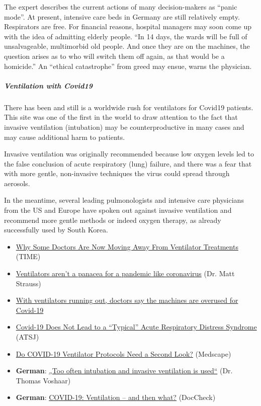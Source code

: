 The expert describes the current actions of many decision-makers as
``panic mode''. At present, intensive care beds in Germany are still
relatively empty. Respirators are free. For financial reasons, hospital
managers may soon come up with the idea of admitting elderly people.
``In 14 days, the wards will be full of unsalvageable, multimorbid old
people. And once they are on the machines, the question arises as to who
will switch them off again, as that would be a homicide.'' An ``ethical
catastrophe'' from greed may ensue, warns the physician.

\hypertarget{ventilation-with-covid19-1}{%
\subparagraph{\texorpdfstring{\textbf{Ventilation with
Covid19}}{Ventilation with Covid19}}\label{ventilation-with-covid19-1}}

There has been and still is a worldwide rush for ventilators for Covid19
patients. This site was one of the first in the world to draw attention
to the fact that invasive ventilation (intubation) may be
counterproductive in many cases and may cause additional harm to
patients.

Invasive ventilation was originally recommended because low oxygen
levels led to the false conclusion of acute respiratory (lung) failure,
and there was a fear that with more gentle, non-invasive techniques the
virus could spread through aerosols.

In the meantime, several leading pulmonologists and intensive care
physicians from the US and Europe have spoken out against invasive
ventilation and recommend more gentle methods or indeed oxygen therapy,
as already successfully used by South Korea.

\begin{itemize}
\tightlist
\item
  \href{https://time.com/5818547/ventilators-coronavirus/}{Why Some
  Doctors Are Now Moving Away From Ventilator Treatments} (TIME)
\item
  \href{https://www.spectator.co.uk/article/Ventilators-aren-t-a-panacea-for-a-pandemic-like-coronavirus}{Ventilators
  aren't a panacea for a pandemic like coronavirus} (Dr. Matt Strauss)
\item
  \href{https://www.statnews.com/2020/04/08/doctors-say-ventilators-overused-for-covid-19/}{With
  ventilators running out, doctors say the machines are overused for
  Covid-19}
\item
  \href{https://www.atsjournals.org/doi/pdf/10.1164/rccm.202003-0817LE}{Covid-19
  Does Not Lead to a ``Typical'' Acute Respiratory Distress Syndrome}
  (ATSJ)
\item
  \href{https://www.medscape.com/viewarticle/928156}{Do COVID-19
  Ventilator Protocols Need a Second Look?} (Medscape)
\item
  \textbf{German}:
  \href{https://www.vpneumo.de/fileadmin/pdf/f2004071.007_Voshaar.pdf}{„Too
  often intubation and invasive ventilation is used``} (Dr. Thomas
  Voshaar)
\item
  \textbf{German}:
  \href{https://www.doccheck.com/de/detail/articles/26271-covid-19-beatmung-und-dann}{COVID-19:
  Ventilation -- and then what?} (DocCheck)
\end{itemize}

